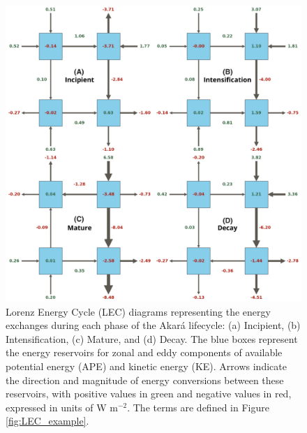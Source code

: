 \documentclass[pdflatex,sn-chicago]{sn-jnl}%
\theoremstyle{plain}
\theoremstyle{definition}
\theoremstyle{remark}
\theoremstyle{definition}
\begin{document}
\begin{figure}[h!]
\centering
\includegraphics[width=\textwidth]{lec.png}
\caption{Lorenz Energy Cycle (LEC) diagrams representing the energy exchanges during each phase of the Akará lifecycle: (a) Incipient, (b) Intensification, (c) Mature, and (d) Decay. The blue boxes represent the energy reservoirs for zonal and eddy components of available potential energy (APE) and kinetic energy (KE). Arrows indicate the direction and magnitude of energy conversions between these reservoirs, with positive values in green and negative values in red, expressed in units of W m\(^{-2}\). The terms are defined in Figure \ref{fig:LEC_example}.}
\label{fig:lec}
\end{figure}
\end{document}

